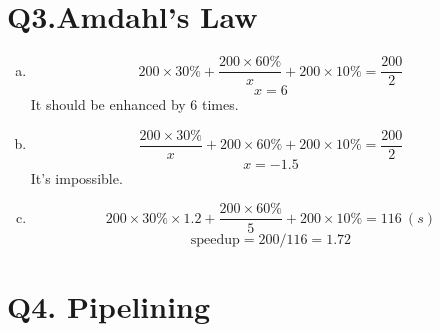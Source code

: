 \documentclass[12pt]{article}
\begin{document}
\section{Q3.Amdahl’s Law}
\begin{enumerate}[a)]
	\item
	$$200\times30\%+\frac{200\times60\%}{x}+200\times10\%=\frac{200}{2}$$
	$$x=6$$
	It should be enhanced by 6 times.
	\item	
	$$\frac{200\times30\%}{x}+200\times60\%+200\times10\%=\frac{200}{2}$$
	$$x=-1.5$$
	It's impossible.
	\item
	$$200\times30\%\times1.2+\frac{200\times60\%}{5}+200\times10\%=116\ (s)$$
	$$\text{speedup}=200/116=1.72$$
\end{enumerate}

\section{Q4. Pipelining}
\end{document}
